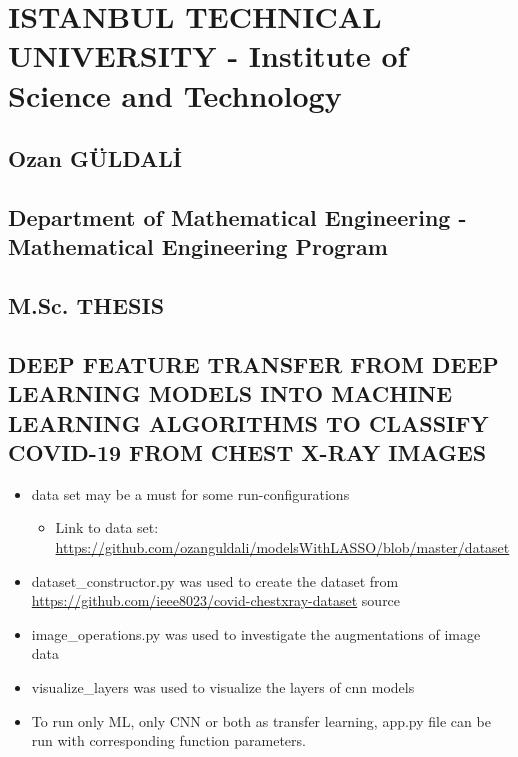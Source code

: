 \section*{ISTANBUL TECHNICAL UNIVERSITY - Institute of Science and
Technology}\label{istanbul-technical-university---institute-of-science-and-technology}

\subsection*{Ozan GÜLDALİ}\label{ozan-guldali}

\subsection*{Department of Mathematical Engineering - Mathematical
Engineering
Program}\label{department-of-mathematical-engineering---mathematical-engineering-program}

\subsection*{M.Sc. THESIS}\label{m.sc.-thesis}

\subsection*{DEEP FEATURE TRANSFER FROM DEEP LEARNING MODELS INTO MACHINE
LEARNING ALGORITHMS TO CLASSIFY COVID-19 FROM CHEST X-RAY IMAGES}\label{deep-feature-transfer-from-deep-learning-models-into-machine-learning-algorithms-to-classify-covid-19-from-chest-x-ray-and-demographic-information}


\begin{itemize}
\item
  data set may be a must for some run-configurations

  \begin{itemize}
  \itemsep1pt\parskip0pt
  \item
    Link to data set:
    \url{https://github.com/ozanguldali/modelsWithLASSO/blob/master/dataset}\\
  \end{itemize}
\item
  dataset\_constructor.py was used to create the dataset from
  \url{https://github.com/ieee8023/covid-chestxray-dataset} source
\item
  image\_operations.py was used to investigate the augmentations of
  image data
\item
  visualize\_layers was used to visualize the layers of cnn models
\item
  To run only ML, only CNN or both as transfer learning, app.py file can
  be run with corresponding function parameters.
\end{itemize}

